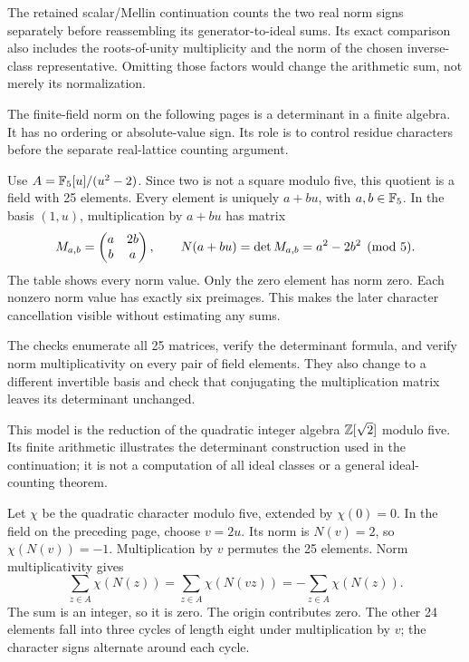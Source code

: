 The retained scalar/Mellin continuation counts the two real norm signs separately before reassembling its generator-to-ideal sums. Its exact comparison also includes the roots-of-unity multiplicity and the norm of the chosen inverse-class representative. Omitting those factors would change the arithmetic sum, not merely its normalization.

The finite-field norm on the following pages is a determinant in a finite algebra. It has no ordering or absolute-value sign. Its role is to control residue characters before the separate real-lattice counting argument.

Use $A=\mathbb F_5[u]/(u^2-2)$. Since two is not a square modulo five, this quotient is a field with 25 elements. Every element is uniquely $a+bu$, with $a,b\in\mathbb F_5$.
In the basis $(1,u)$, multiplication by $a+bu$ has matrix
\[
M_{a,b}=\begin{pmatrix}a&2b\\b&a\end{pmatrix},
\qquad N(a+bu)=\det M_{a,b}=a^2-2b^2\pmod5.
\]
The table shows every norm value. Only the zero element has norm zero. Each nonzero norm value has exactly six preimages. This makes the later character cancellation visible without estimating any sums.

The checks enumerate all 25 matrices, verify the determinant formula, and verify norm multiplicativity on every pair of field elements. They also change to a different invertible basis and check that conjugating the multiplication matrix leaves its determinant unchanged.

This model is the reduction of the quadratic integer algebra $\mathbb Z[\sqrt2]$ modulo five. Its finite arithmetic illustrates the determinant construction used in the continuation; it is not a computation of all ideal classes or a general ideal-counting theorem.

Let $\chi$ be the quadratic character modulo five, extended by $\chi(0)=0$. In the field on the preceding page, choose $v=2u$. Its norm is $N(v)=2$, so $\chi(N(v))=-1$.
Multiplication by $v$ permutes the 25 elements. Norm multiplicativity gives
\[
\sum_{z\in A}\chi(N(z))
=\sum_{z\in A}\chi(N(vz))
=-\sum_{z\in A}\chi(N(z)).
\]
The sum is an integer, so it is zero. The origin contributes zero. The other 24 elements fall into three cycles of length eight under multiplication by $v$; the character signs alternate around each cycle.

